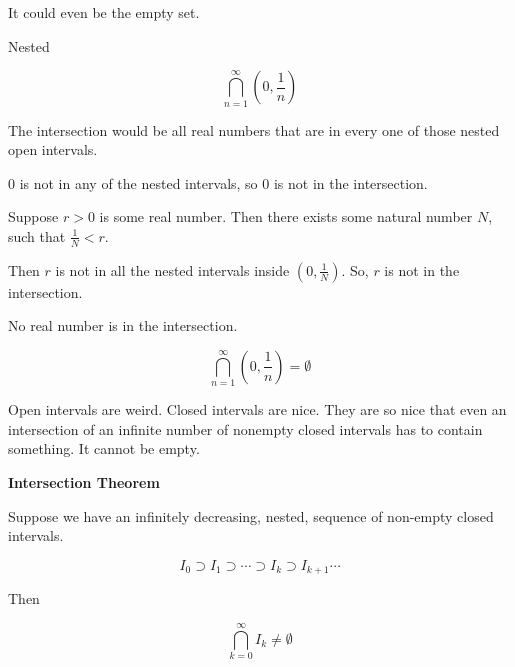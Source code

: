 \documentclass{ximera}
\begin{document}
It could even be the empty set.



\begin{example} Nested


\[ \bigcap_{n=1}^{\infty}   \left(0,  \frac{1}{n}\right)     \]



The intersection would be all real numbers that are in every one of those nested open intervals.


$0$ is not in any of the nested intervals, so $0$ is not in the intersection.


Suppose $r>0$ is some real number.  Then there exists some natural number $N$, such that $\frac{1}{N} < r$.

Then $r$ is not in all the nested intervals inside $\left(0,  \frac{1}{N}\right)$. So, $r$ is not in the intersection.


No real number is in the intersection.


\[ \bigcap_{n=1}^{\infty}   \left(0,  \frac{1}{n}\right)  = \emptyset    \]



\end{example}










Open intervals are weird.  Closed intervals are nice.  They are so nice that even an intersection of an infinite number of nonempty closed intervals has to contain something.  It cannot be empty.




\begin{theorem} \textbf{\textcolor{-red!75!green}{Intersection Theorem}}  


Suppose we have an infinitely decreasing, nested, sequence of non-empty closed intervals.


\[   I_0 \supset    I_1 \supset  \cdots \supset I_{k}   \supset I_{k+1}  \cdots  \]



Then 


\[   \bigcap_{k=0}^{\infty} I_{k} \ne \emptyset         \]


\end{theorem}
\end{document}

